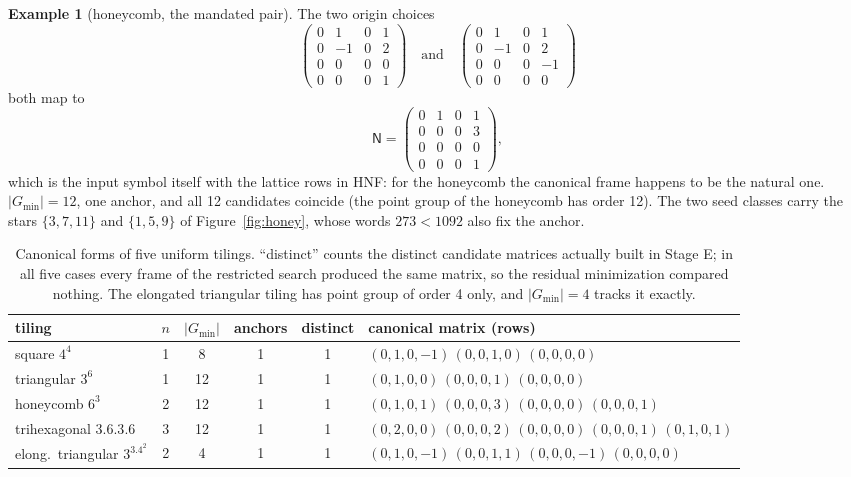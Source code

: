 \documentclass[11pt]{article}
\theoremstyle{definition}
\newtheorem{example}[theorem]{Example}
\newcommand{\Gmin}{G_{\min}}
\newcommand{\N}{\mathsf{N}}
\begin{document}
\begin{example}[honeycomb, the mandated pair]\label{ex:honey}
The two origin choices
\[
  \begin{pmatrix}0&1&0&1\\0&-1&0&2\\0&0&0&0\\0&0&0&1\end{pmatrix}
  \quad\text{and}\quad
  \begin{pmatrix}0&1&0&1\\0&-1&0&2\\0&0&0&-1\\0&0&0&0\end{pmatrix}
\]
both map to
\[
  \N=\begin{pmatrix}0&1&0&1\\0&0&0&3\\0&0&0&0\\0&0&0&1\end{pmatrix},
\]
which is the input symbol itself with the lattice rows in HNF: for the honeycomb the
canonical frame happens to be the natural one. $|\Gmin|=12$, one anchor, and all 12
candidates coincide (the point group of the honeycomb has order 12). The two seed classes
carry the stars $\{3,7,11\}$ and $\{1,5,9\}$ of Figure~\ref{fig:honey}, whose words
$273<1092$ also fix the anchor.
\end{example}

\begin{table}[t]
\centering
\small
\begin{tabular}{@{}lccccl@{}}
\toprule
tiling & $n$ & $|\Gmin|$ & anchors & distinct & canonical matrix (rows) \\
\midrule
square $4^4$ & 1 & 8 & 1 & 1 &
 $(0,1,0,-1)\,(0,0,1,0)\,(0,0,0,0)$ \\
triangular $3^6$ & 1 & 12 & 1 & 1 &
 $(0,1,0,0)\,(0,0,0,1)\,(0,0,0,0)$ \\
honeycomb $6^3$ & 2 & 12 & 1 & 1 &
 $(0,1,0,1)\,(0,0,0,3)\,(0,0,0,0)\,(0,0,0,1)$ \\
trihexagonal $3.6.3.6$ & 3 & 12 & 1 & 1 &
 $(0,2,0,0)\,(0,0,0,2)\,(0,0,0,0)\,(0,0,0,1)\,(0,1,0,1)$ \\
elong.\ triangular $3^3.4^2$ & 2 & 4 & 1 & 1 &
 $(0,1,0,-1)\,(0,0,1,1)\,(0,0,0,-1)\,(0,0,0,0)$ \\
\bottomrule
\end{tabular}
\caption{Canonical forms of five uniform tilings. ``distinct'' counts the distinct
candidate matrices actually built in Stage E; in all five cases every frame of the
restricted search produced the same matrix, so the residual minimization compared nothing.
The elongated triangular tiling has point group of order 4 only, and $|\Gmin|=4$ tracks it
exactly.}
\label{tab:instances}
\end{table}
\end{document}
